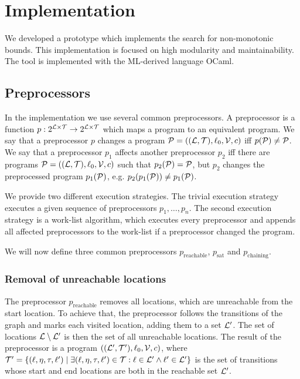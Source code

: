 \section{Implementation}

We developed a prototype which implements the search for non-monotonic bounds.
This implementation is focused on high modularity and maintainability.
The tool is implemented with the ML-derived language OCaml.

\subsection{Preprocessors}

In the implementation we use several common preprocessors.
A preprocessor is a function $p: 2^{\mathcal{L} \times \mathcal{T}} \rightarrow 2^{\mathcal{L} \times \mathcal{T}}$ which maps a program to an equivalent program.
We say that a preprocessor $p$ changes a program $\mathcal{P} = ((\mathcal{L}, \mathcal{T}), \ell_0, \mathcal{V}, c)$ iff $p(\mathcal{P}) \neq \mathcal{P}$.
We say that a preprocessor $p_1$ affects another preprocessor $p_2$ iff there are programs $\mathcal{P} = ((\mathcal{L}, \mathcal{T}), \ell_0, \mathcal{V}, c)$ such that $p_2(\mathcal{P}) = \mathcal{P}$, but $p_2$ changes the preprocessed program $p_1(\mathcal{P})$, e.g. $p_2(p_1(\mathcal{P})) \neq p_1(\mathcal{P})$.

We provide two different execution strategies.
The trivial execution strategy executes a given sequence of preprocessors $p_1, \dots, p_n$.
The second execution strategy is a work-list algorithm, which executes every preprocessor and appends all affected preprocessors to the work-list if a preprocessor changed the program.

We will now define three common preprocessors $p_{\text{reachable}}$, $p_{\text{sat}}$ and $p_{\text{chaining}}$.

\subsubsection{Removal of unreachable locations}

The preprocessor $p_{\text{reachable}}$ removes all locations, which are unreachable from the start location.
To achieve that, the preprocessor follows the transitions of the graph and marks each visited location, adding them to a set $\mathcal{L}'$.
The set of locations $\mathcal{L} \setminus \mathcal{L}'$ is then the set of all unreachable locations.
The result of the preprocessor is a program $((\mathcal{L}', \mathcal{T}'), \ell_0, \mathcal{V}, c)$, where $\mathcal{T}' = \lbrace (\ell,\eta,\tau,\ell') \mid \exists (\ell,\eta,\tau,\ell') \in \mathcal{T}: \ell \in \mathcal{L}' \wedge \ell' \in \mathcal{L}' \rbrace$ is the set of transitions whose start and end locations are both in the reachable set $\mathcal{L}'$.


